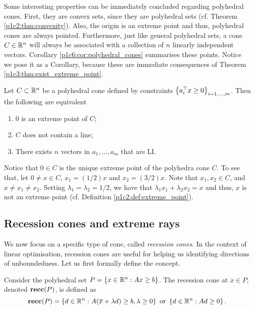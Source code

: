 Some interesting properties can be immediately concluded regarding polyhedral cones. First, they are convex sets, since they are polyhedral sets (cf. Theorem \ref{p1c2:thm:convexity}). Also, the origin is an extreme point and thus, polyhedral cones are always pointed. Furthermore, just like general polyhedral sets, a cone $C \in \mathbb{R}^n$ will always be associated with a collection of $n$ linearly independent vectors. Corollary \ref{p1c6:cor:polyhedral_cones} summarises these points. Notice we pose it as a Corollary, because these are immediate consequences of Theorem \ref{p1c3:thm:exist_extreme_point}.

\begin{corollary}\label{p1c6:cor:polyhedral_cones} 
	Let $C \subset \mathbb{R}^n$ be a polyhedral cone defined by constraints $\left\{ a_i^\top x \geq 0 \right \}_{i =1,\dots,m}$. Then the following are equivalent
	\begin{enumerate}
		\item $0$ is an extreme point of $C$;
		\item $C$ does not contain a line;
		\item There exists $n$ vectors in $a_1, \dots, a_m$ that are LI.	
	\end{enumerate}
\end{corollary}

Notice that $0 \in C$ is the unique extreme point of the polyhedra cone $C$. To see that, let $0 \neq x \in C$, $x_1 = (1/2) x$ and $x_2 = (3/2)x$. Note that $x_1, x_2 \in C$, and $x \neq x_1 \neq x_2$. Setting $\lambda_1 = \lambda_2 = 1/2$, we have that $\lambda_1x_1  + \lambda_2x_2 = x$ and thus, $x$ is not an extreme point (cf. Definition \ref{p1c2:def:extreme_point}). 


\subsection{Recession cones and extreme rays}

We now focus on a specific type of cone, called \emph{recession cones}. In the context of linear optimisation, recession cones are useful for helping us identifying directions of unboundedness. Let us first formally define the concept.

\begin{definition} \label{c1_p6:def:recession_cone}
	Consider the polyhedral set $P = \left\{ x \in \mathbb{R}^n : Ax \geq b \right \}$. The recession cone at $\overline{x} \in P$, denoted ${\bf recc}(P)$, is defined as
	\begin{equation*}
		{\bf recc}(P) = \left\{ d \in \mathbb{R}^n : A(\overline{x} + \lambda d) \geq b, \lambda \geq 0 \right \} \text{ or } \left\{ d \in \mathbb{R}^n : Ad \geq 0 \right \}. 	
	\end{equation*}
\end{definition}

